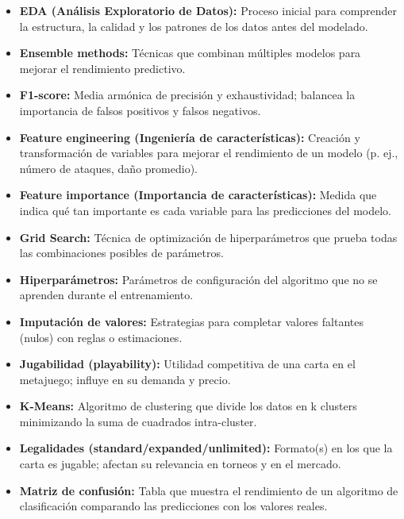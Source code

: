 \documentclass[12pt,letterpaper]{article}
\begin{document}
\begin{itemize}
    \item \textbf{EDA (Análisis Exploratorio de Datos):} Proceso inicial para comprender la estructura, la calidad y los patrones de los datos antes del modelado.
    
    \item \textbf{Ensemble methods:} Técnicas que combinan múltiples modelos para mejorar el rendimiento predictivo.
    
    \item \textbf{F1-score:} Media armónica de precisión y exhaustividad; balancea la importancia de falsos positivos y falsos negativos.
    
    \item \textbf{Feature engineering (Ingeniería de características):} Creación y transformación de variables para mejorar el rendimiento de un modelo (p. ej., número de ataques, daño promedio).
    
    \item \textbf{Feature importance (Importancia de características):} Medida que indica qué tan importante es cada variable para las predicciones del modelo.
    
    \item \textbf{Grid Search:} Técnica de optimización de hiperparámetros que prueba todas las combinaciones posibles de parámetros.
    
    \item \textbf{Hiperparámetros:} Parámetros de configuración del algoritmo que no se aprenden durante el entrenamiento.
    
    \item \textbf{Imputación de valores:} Estrategias para completar valores faltantes (nulos) con reglas o estimaciones.
    
    \item \textbf{Jugabilidad (playability):} Utilidad competitiva de una carta en el metajuego; influye en su demanda y precio.
    
    \item \textbf{K-Means:} Algoritmo de clustering que divide los datos en k clusters minimizando la suma de cuadrados intra-cluster.
    
    \item \textbf{Legalidades (standard/expanded/unlimited):} Formato(s) en los que la carta es jugable; afectan su relevancia en torneos y en el mercado.
    
    \item \textbf{Matriz de confusión:} Tabla que muestra el rendimiento de un algoritmo de clasificación comparando las predicciones con los valores reales.
    

\end{itemize}
\end{document}
